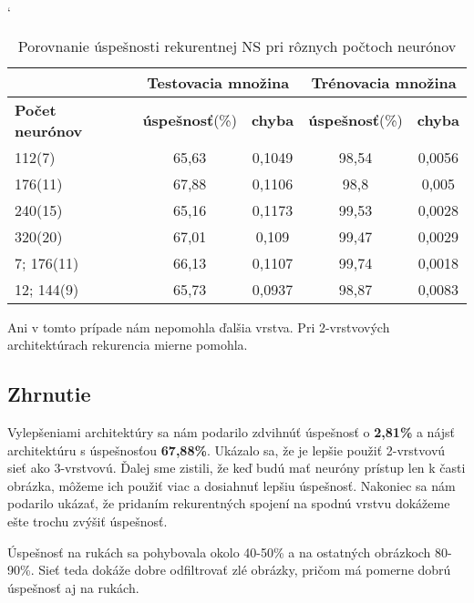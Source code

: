 \begin{table}[htp]
\catcode` %
\centering
\begin{tabular}{|l|c|c|c|c|}
\cline{2-5}
\multicolumn{1}{l}{} & \multicolumn{2}{|c|}{\textbf{Testovacia množina}} & \multicolumn{2}{c|}{\textbf{Trénovacia množina}}\\ 
\hline
\textbf{Počet neurónov} & \textbf{úspešnosť}(\%) & \textbf{chyba} & \textbf{úspešnosť}(\%) & \textbf{chyba} \\ \hline
112(7) & 65,63 & 0,1049 & 98,54 & 0,0056  \\ \hline
176(11) & 67,88 & 0,1106 & 98,8 & 0,005  \\ \hline
240(15) & 65,16 & 0,1173 & 99,53 & 0,0028  \\ \hline
320(20) & 67,01 & 0,109 & 99,47 & 0,0029 \\ \hline
7; 176(11) & 66,13 & 0,1107 & 99,74 & 0,0018 \\ \hline
12; 144(9) & 65,73 & 0,0937 & 98,87 & 0,0083 \\ \hline
\end{tabular}
\caption{Porovnanie úspešnosti rekurentnej NS pri rôznych počtoch neurónov}
\label{tab:neuroncountcmp3}
\end{table}

Ani v tomto prípade nám nepomohla ďalšia vrstva. Pri 2-vrstvových architektúrach rekurencia mierne pomohla.

\subsection{Zhrnutie}

Vylepšeniami architektúry sa nám podarilo zdvihnúť úspešnosť o \textbf{2,81\%} a nájsť architektúru s úspešnosťou \textbf{67,88\%}. Ukázalo sa, že je lepšie použiť 2-vrstvovú sieť ako 3-vrstvovú. Ďalej sme zistili, že keď budú mať neuróny prístup len k časti obrázka, môžeme ich použiť viac a dosiahnuť lepšiu úspešnosť. Nakoniec sa nám podarilo ukázať, že pridaním rekurentných spojení na spodnú vrstvu dokážeme ešte trochu zvýšiť úspešnosť.

Úspešnosť na rukách sa pohybovala okolo 40-50\% a na ostatných obrázkoch 80-90\%. Sieť teda dokáže dobre odfiltrovať zlé obrázky, pričom má pomerne dobrú úspešnosť aj na rukách.

